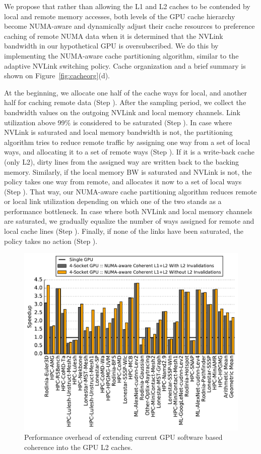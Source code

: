 We propose that rather than allowing the L1 and L2 caches to be 
contended by local and remote memory accesses, both levels of the GPU cache 
hierarchy become NUMA-aware and dynamically adjust their cache resources to 
preference caching of remote NUMA data when it is determined that the NVLink 
bandwidth in our hypothetical GPU is oversubscribed. We do this by 
implementing the NUMA-aware cache partitioning algorithm, similar to the 
adaptive NVLink switching policy. Cache organization and a brief summary is 
shown on Figure~\ref{fig:cacheorg}(d). 

At the beginning, we allocate one half of the cache ways for local, and 
another half for caching remote data (Step ). After the sampling 
period, we collect the bandwidth values on the outgoing NVLink and local 
memory channels. Link utilization above 99\% is considered to be saturated 
(Step ). In case where NVLink is saturated and local memory 
bandwidth is not, the partitioning algorithm tries to reduce remote traffic 
by assigning one way from a set of local ways, and allocating it to a set of 
remote ways (Step ). If it is a write-back cache (only L2), dirty 
lines from the assigned way are written back to the backing memory. 
Similarly, if the local memory BW is saturated and NVLink is not, the policy 
takes one way from remote, and allocates it now to a set of local ways (Step 
). That way, our NUMA-aware cache partitioning algorithm reduces 
remote or local link utilization depending on which one of the two stands as 
a performance bottleneck. In case where both NVLink and local memory channels 
are saturated, we gradually equalize the number of ways assigned for remote 
and local cache lines (Step ). Finally, if none of the links have 
been saturated, the policy takes no action (Step ).

\begin{figure}[t]
    \centering
    \includegraphics[width=1.0\columnwidth]{figures/plot_no_inval_WB.pdf}
    \caption{Performance overhead of extending current GPU software based coherence
    into the GPU L2 caches.}
    \label{fig:invalidations}
    \vspace{-.2in}
\end{figure}

